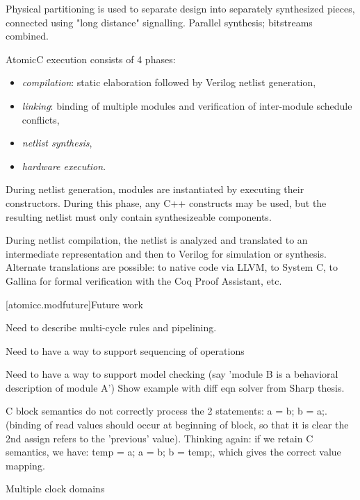 Physical partitioning is used to separate design into separately synthesized pieces, connected using
"long distance" signalling.  Parallel synthesis; bitstreams combined.

AtomicC execution consists of 4 phases:
\begin{itemize}
\item \textit{compilation}: static elaboration followed by Verilog netlist generation, 
\item \textit{linking}: binding of multiple modules and verification of inter-module schedule conflicts,
\item \textit{netlist synthesis},
\item \textit{hardware execution}.
\end{itemize}

During netlist
generation, modules are instantiated by executing their
constructors. During this phase, any C++ constructs may be used, but
the resulting netlist must only contain synthesizeable components.

During netlist compilation, the netlist is analyzed and translated to
an intermediate representation and then to Verilog for simulation or
synthesis. Alternate translations are possible: to native code via
LLVM, to System C, to Gallina for formal verification with the Coq
Proof Assistant, etc.

[atomicc.modfuture]{Future work}

Need to describe multi-cycle rules and pipelining.

Need to have a way to support sequencing of operations

Need to have a way to support model checking (say 'module B is a behavioral description of module A')
Show example with diff eqn solver from Sharp thesis.

C block semantics do not correctly process the 2 statements: a = b; b = a;.
(binding of read values should occur at beginning of block, so that it is clear the
2nd assign refers to the 'previous' value).
Thinking again: if we retain C semantics, we have: temp = a; a = b; b = temp;, which
gives the correct value mapping.

Multiple clock domains
